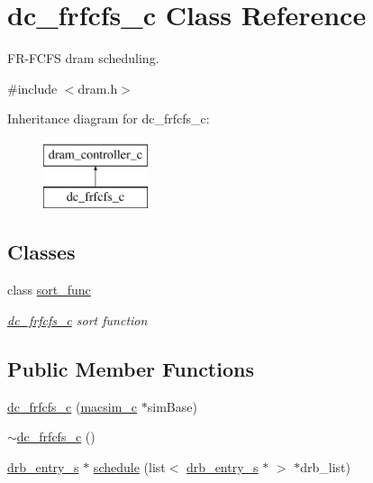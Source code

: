 \hypertarget{classdc__frfcfs__c}{
\section{dc\_\-frfcfs\_\-c Class Reference}
\label{classdc__frfcfs__c}
}


FR-\/FCFS dram scheduling.  




{\ttfamily \#include $<$dram.h$>$}

Inheritance diagram for dc\_\-frfcfs\_\-c:\begin{figure}[H]
\begin{center}
\leavevmode
\includegraphics[height=2.000000cm]{classdc__frfcfs__c}
\end{center}
\end{figure}
\subsection*{Classes}
\begin{DoxyCompactItemize}
\item 
class \hyperlink{classdc__frfcfs__c_1_1sort__func}{sort\_\-func}
\begin{DoxyCompactList}\small\item\em \hyperlink{classdc__frfcfs__c}{dc\_\-frfcfs\_\-c} sort function \item\end{DoxyCompactList}\end{DoxyCompactItemize}
\subsection*{Public Member Functions}
\begin{DoxyCompactItemize}
\item 
\hyperlink{classdc__frfcfs__c_ae20cabf0dd64d9d9bac5f5867e73e782}{dc\_\-frfcfs\_\-c} (\hyperlink{classmacsim__c}{macsim\_\-c} $\ast$simBase)
\item 
\hyperlink{classdc__frfcfs__c_a073941102a81c46c76a92b6ecdedc6bd}{$\sim$dc\_\-frfcfs\_\-c} ()
\item 
\hyperlink{structdrb__entry__s}{drb\_\-entry\_\-s} $\ast$ \hyperlink{classdc__frfcfs__c_a4ee4def84ca42d169c13aec01590eeb8}{schedule} (list$<$ \hyperlink{structdrb__entry__s}{drb\_\-entry\_\-s} $\ast$ $>$ $\ast$drb\_\-list)
\end{DoxyCompactItemize}
